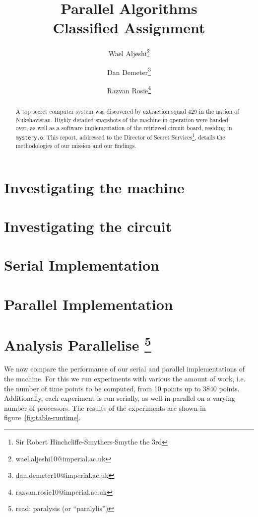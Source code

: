 \documentclass[11pt,twocolumn]{article} %
\title{Parallel Algorithms \\ Classified Assignment}
\author{Wael Aljeshi\thanks{wael.aljeshi10@imperial.ac.uk}}
\author{Dan Demeter\thanks{dan.demeter10@imperial.ac.uk}}
\author{Razvan Rosie\thanks{razvan.rosie10@imperial.ac.uk}}
\affil{Department of Computing, Imperial College London}
\begin{document}
\maketitle

\renewcommand{\abstractname}{Mission Brief}

\begin{abstract}
A top secret computer system was discovered by extraction squad 429 in the nation of Nukehavistan. Highly detailed snapshots of the machine in operation were handed over, as well as a software implementation of the retrieved circuit board, residing in \texttt{mystery.o}. This report, addressed to the Director of Secret Services\footnote{Sir Robert Hinchcliffe-Smythers-Smythe the 3rd}, details the methodologies of our mission and our findings.
\end{abstract}



\section{Investigating the machine}
 

\section{Investigating the circuit}


\section{Serial Implementation}


\section{Parallel Implementation}


\section[Analysis Parallelise]{Analysis Parallelise \footnote{read: paralysis (or ``paralylis'')} }

We now compare the performance of our serial and parallel implementations of the machine. For this we run experiments with various the amount of work, i.e. the number of time points to be computed, from 10 points up to 3840 points. Additionally, each experiment is run serially, as well in parallel on a varying number of processors. The results of the experiments are shown in figure~\ref{fig:table-runtime}.
\end{document}

